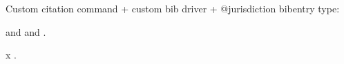 


%
{%
%
}%
{%
%
}%
{%
\multicitedelim%
}%
{%
%
}

%





\usepackage[
				bookmarks,
            colorlinks=true,        
            allcolors = black,  
            citecolor=blue, 
            hyperindex=false,       
]{hyperref}







Custom citation command + custom bib driver + @jurisdiction bibentry type:

 and  and .

x \parencite{reese,kullback:related,aristotle:anima}.

\printbibliography%
 
